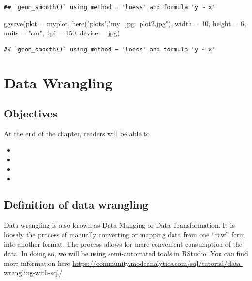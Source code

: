 \documentclass[
  10pt,
]{krantz}
\newenvironment{Shaded}{\begin{snugshade}}{\end{snugshade}}
\newcommand{\AttributeTok}[1]{\textcolor[rgb]{0.77,0.63,0.00}{#1}}
\newcommand{\DecValTok}[1]{\textcolor[rgb]{0.00,0.00,0.81}{#1}}
\newcommand{\FunctionTok}[1]{\textcolor[rgb]{0.00,0.00,0.00}{#1}}
\newcommand{\NormalTok}[1]{#1}
\newcommand{\StringTok}[1]{\textcolor[rgb]{0.31,0.60,0.02}{#1}}
\providecommand{\tightlist}{%
  \setlength{\itemsep}{0pt}\setlength{\parskip}{0pt}}
\begin{document}
\begin{verbatim}
## `geom_smooth()` using method = 'loess' and formula 'y ~ x'
\end{verbatim}

\begin{Shaded}
\begin{Highlighting}[]
\FunctionTok{ggsave}\NormalTok{(}\AttributeTok{plot =}\NormalTok{ myplot, }
       \FunctionTok{here}\NormalTok{(}\StringTok{"plots"}\NormalTok{,}\StringTok{"my\_jpg\_plot2.jpg"}\NormalTok{), }
       \AttributeTok{width =} \DecValTok{10}\NormalTok{, }\AttributeTok{height =} \DecValTok{6}\NormalTok{, }\AttributeTok{units =} \StringTok{"cm"}\NormalTok{,}
       \AttributeTok{dpi =} \DecValTok{150}\NormalTok{, }\AttributeTok{device =} \StringTok{\textquotesingle{}jpg\textquotesingle{}}\NormalTok{)}
\end{Highlighting}
\end{Shaded}

\begin{verbatim}
## `geom_smooth()` using method = 'loess' and formula 'y ~ x'
\end{verbatim}

\hypertarget{data-wrangling}{%
\chapter{Data Wrangling}\label{data-wrangling}}

\hypertarget{objectives-3}{%
\section{Objectives}\label{objectives-3}}

At the end of the chapter, readers will be able to

\begin{itemize}
\tightlist
\item
\item
\item
\item
\end{itemize}

\hypertarget{definition-of-data-wrangling}{%
\section{\texorpdfstring{Definition of data wrangling}{Definition of data wrangling}}\label{definition-of-data-wrangling}}

Data wrangling is also known as Data Munging or Data Transformation. It is loosely the process of manually converting or mapping data from one ``raw'' form into another format. The process allows for more convenient consumption of the data. In doing so, we will be using semi-automated tools in RStudio. You can find more information here \url{https://community.modeanalytics.com/sql/tutorial/data-wrangling-with-sql/}
\end{document}
